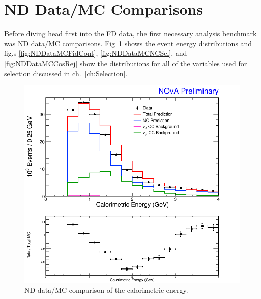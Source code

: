\section{ND Data/MC Comparisons}

Before diving head first into the FD data, the first necessary analysis benchmark was ND data/MC comparisons. Fig~\ref{fig:NDDataMCECal} shows the event energy distributions and fig.s \ref{fig:NDDataMCFidCont}, \ref{fig:NDDataMCNCSel}, and \ref{fig:NDDataMCCosRej} show the distributions for all of the variables used for selection discussed in ch.~\ref{ch:Selection}.
\begin{figure}[htbp]
  \centering
  \includegraphics[width=1\textwidth]{figures/NDDataMC/ECalNusNDRat.png}
  \caption[ND Data/MC Comparison: Energy Distribution]{ND data/MC comparison of the calorimetric energy.}
  \label{fig:NDDataMCECal}
\end{figure}

